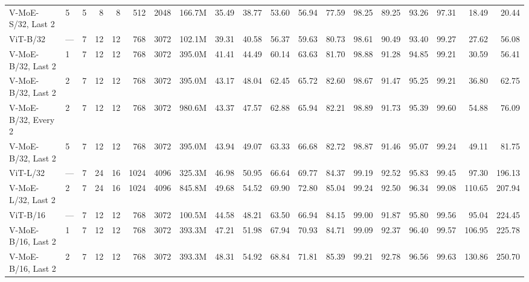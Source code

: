 \documentclass{article}
\begin{document}
\begin{landscape}
\begin{table}[H]
{{\begin{tabular}{llrrrrrrrrrrrrrrrrr}
  V-MoE-S/32, Last 2 &    5 &       5 &       8 &      8 &     512 &  2048 &   166.7M &    35.49 &   38.77 &   53.60 &    56.94 &    77.59 &   98.25 &    89.25 &   93.26 &   97.31 &      18.49 &    20.44 \\
            ViT-B/32 &  --- &       7 &      12 &     12 &     768 &  3072 &   102.1M &    39.31 &   40.58 &   56.37 &    59.63 &    80.73 &   98.61 &    90.49 &   93.40 &   99.27 &      27.62 &    56.08 \\
  V-MoE-B/32, Last 2 &    1 &       7 &      12 &     12 &     768 &  3072 &   395.0M &    41.41 &   44.49 &   60.14 &    63.63 &    81.70 &   98.88 &    91.28 &   94.85 &   99.21 &      30.59 &    56.41 \\
  V-MoE-B/32, Last 2 &    2 &       7 &      12 &     12 &     768 &  3072 &   395.0M &    43.17 &   48.04 &   62.45 &    65.72 &    82.60 &   98.67 &    91.47 &   95.25 &   99.21 &      36.80 &    62.75 \\
 V-MoE-B/32, Every 2 &    2 &       7 &      12 &     12 &     768 &  3072 &   980.6M &    43.37 &   47.57 &   62.88 &    65.94 &    82.21 &   98.89 &    91.73 &   95.39 &   99.60 &      54.88 &    76.09 \\
  V-MoE-B/32, Last 2 &    5 &       7 &      12 &     12 &     768 &  3072 &   395.0M &    43.94 &   49.07 &   63.33 &    66.68 &    82.72 &   98.87 &    91.46 &   95.07 &   99.24 &      49.11 &    81.75 \\
            ViT-L/32 &  --- &       7 &      24 &     16 &    1024 &  4096 &   325.3M &    46.98 &   50.95 &   66.64 &    69.77 &    84.37 &   99.19 &    92.52 &   95.83 &   99.45 &      97.30 &   196.13 \\
  V-MoE-L/32, Last 2 &    2 &       7 &      24 &     16 &    1024 &  4096 &   845.8M &    49.68 &   54.52 &   69.90 &    72.80 &    85.04 &   99.24 &    92.50 &   96.34 &   99.08 &     110.65 &   207.94 \\
            ViT-B/16 &  --- &       7 &      12 &     12 &     768 &  3072 &   100.5M &    44.58 &   48.21 &   63.50 &    66.94 &    84.15 &   99.00 &    91.87 &   95.80 &   99.56 &      95.04 &   224.45 \\
  V-MoE-B/16, Last 2 &    1 &       7 &      12 &     12 &     768 &  3072 &   393.3M &    47.21 &   51.98 &   67.94 &    70.93 &    84.71 &   99.09 &    92.37 &   96.40 &   99.57 &     106.95 &   225.78 \\
  V-MoE-B/16, Last 2 &    2 &       7 &      12 &     12 &     768 &  3072 &   393.3M &    48.31 &   54.92 &   68.84 &    71.81 &    85.39 &   99.21 &    92.78 &   96.56 &   99.63 &     130.86 &   250.70 \\

\end{tabular}}}
\end{table}
\end{landscape}
\end{document}
